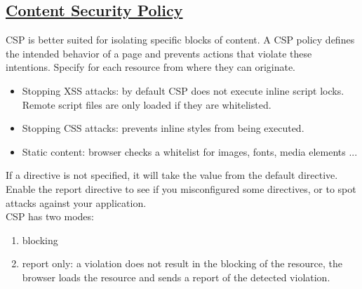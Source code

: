 \documentclass[titlepage]{article}
\begin{document}
    \subsection{\href{https://youtu.be/hZ1rYnvkdK0}{Content Security Policy}}  
    CSP is better suited for isolating specific blocks of content. A CSP policy defines the intended behavior of a page and prevents actions that violate these intentions. Specify for each resource from where they can originate.
    \begin{itemize}
        \item Stopping XSS attacks: by default CSP does not execute inline script locks. Remote script files are only loaded if they are whitelisted.
        \item Stopping CSS attacks: prevents inline styles from being executed.
        \item Static content: browser checks a whitelist for images, fonts, media elements ...
    \end{itemize}
    If a directive is not specified, it will take the value from the default directive.\\
    Enable the report directive to see if you misconfigured some directives, or to spot attacks against your application.\\
    CSP has two modes:
    \begin{enumerate}
        \item blocking
        \item report only: a violation does not result in the blocking of the resource, the browser loads the resource and sends a report of the detected violation.
    \end{enumerate}
\end{document}
